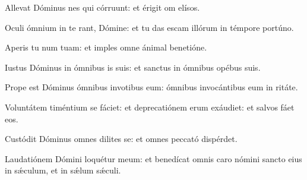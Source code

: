 \item {}

\item Allevat Dóminus nes qui córruunt:\psstar{} et érigit om elísos.

\item Oculi ómnium in te rant, Dómine:\psstar{} et tu das escam illórum in témpore portúno.

\item Aperis tu num tuam:\psstar{} et imples omne ánimal benetióne.

\item Iustus Dóminus in ómnibus is suis:\psstar{} et sanctus in ómnibus opébus suis.

\item Prope est Dóminus ómnibus invotibus eum:\psstar{} ómnibus invocántibus eum in ritáte.

\item Voluntátem timéntium se fáciet:\pscross{} et deprecatiónem erum exáudiet:\psstar{} et salvos fáet eos.

\item Custódit Dóminus omnes dilites se:\psstar{} et omnes peccató dispérdet.

\item Laudatiónem Dómini loquétur  meum:\psstar{} et benedícat omnis caro nómini sancto eius in sǽculum, et in sǽlum sǽculi.

